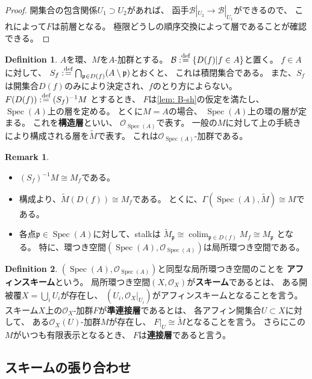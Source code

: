 \documentclass[uplatex]{jsarticle}
\theoremstyle{definition}
\newtheorem{defi}[defi]{Definition}
\newtheorem{rem}[rem]{Remark}
\DeclareMathOperator{\Spec}{\mathrm{Spec}}
\DeclareMathOperator{\colim}{\mathrm{colim}}
\newcommand{\dfn}{:\overset{\mbox{{\scriptsize def}}}{=}}
\newcommand{\mcB}{\mathcal{B}}
\newcommand{\mcO}{\mathcal{O}}
\newcommand{\mfp}{\mathfrak{p}}
\begin{document}
\begin{proof}
  開集合の包含関係\(U_1\supset U_2\)があれば、
  函手\(\mcB|_{U_2} \to \mcB|_{U_1}\)ができるので、
  これによって\(F\)は前層となる。
  極限どうしの順序交換によって層であることが確認できる。
\end{proof}


\begin{defi}
  \(A\)を環、\(M\)を\(A\)-加群とする。
  \(\mcB\dfn \{D(f)|f\in A\}\)と置く。
  \(f\in A\)に対して、
  \(S_f\dfn \bigcap_{\mfp\in D(f)}(A\setminus \mfp)\)とおくと、
  これは積閉集合である。
  また、\(S_f\)は開集合\(D(f)\)のみにより決定され、\(f\)のとり方によらない。
  \(F(D(f))\dfn (S_f)^{-1}M\)
  とするとき、
  \(F\)は\autoref{lem: B-sh}の仮定を満たし、
  \(\Spec(A)\)上の層を定める。
  とくに\(M=A\)の場合、
  \(\Spec(A)\)上の環の層が定まる。
  これを\textbf{構造層}といい、
  \(\mcO_{\Spec(A)}\)で表す。
  一般の\(M\)に対して上の手続きにより構成される層を\(\tilde{M}\)で表す。
  これは\(\mcO_{\Spec(A)}\)-加群である。
\end{defi}

\begin{rem}
  \begin{itemize}
    \item
    \((S_f)^{-1}M \cong M_f\)である。
    \item
    構成より、\(\tilde{M}(D(f)) \cong M_f\)である。
    とくに、\(\Gamma(\Spec(A),\tilde{M}) \cong M\)である。
    \item
    各点\(\mfp\in \Spec(A)\)に対して、stalkは
    \(\tilde{M}_{\mfp} \cong \colim_{\mfp\in D(f)} M_f \cong M_{\mfp}\)
    となる。
    特に、環つき空間\((\Spec(A),\mcO_{\Spec(A)})\)は局所環つき空間である。
  \end{itemize}
\end{rem}



\begin{defi}
  \((\Spec(A),\mcO_{\Spec(A)})\)と同型な局所環つき空間のことを
  \textbf{アフィンスキーム}という。
  局所環つき空間\((X,\mcO_X)\)が\textbf{スキーム}であるとは、
  ある開被覆\(X = \bigcup_i U_i\)が存在し、
  \((U_i,\mcO_X|_{U_i})\)がアフィンスキームとなることを言う。
  スキーム\(X\)上の\(\mcO_X\)-加群\(F\)が\textbf{準連接層}であるとは、
  各アフィン開集合\(U\subset X\)に対して、
  ある\(\mcO_X(U)\)-加群\(M\)が存在し、
  \(F|_U\cong \tilde{M}\)となることを言う。
  さらにこの\(M\)がいつも有限表示となるとき、
  \(F\)は\textbf{連接層}であると言う。
\end{defi}


\subsection{スキームの張り合わせ}
\end{document}
